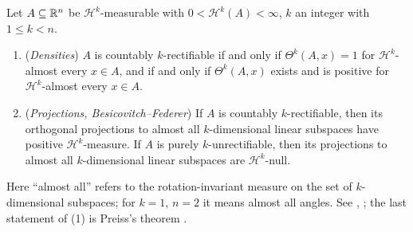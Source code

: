\begin{theorem}\label{measure-theory:theorem-rectifiability-criteria}
Let $A \subseteq \mathbb{R}^n$ be $\mathcal{H}^k$-measurable with $0 < \mathcal{H}^k(A) < \infty$, $k$ an integer with $1 \leq k < n$.
\begin{enumerate}
\item (\emph{Densities}) $A$ is countably $k$-rectifiable if and only if $\Theta^k(A, x) = 1$ for $\mathcal{H}^k$-almost every $x \in A$, and if and only if $\Theta^k(A, x)$ exists and is positive for
$\mathcal{H}^k$-almost every $x \in A$.
\item (\emph{Projections, Besicovitch--Federer}) If $A$ is countably $k$-rectifiable, then its orthogonal projections to almost all $k$-dimensional linear subspaces have positive $\mathcal{H}^k$-measure. If
$A$ is purely $k$-unrectifiable, then its projections to almost all $k$-dimensional linear subspaces are $\mathcal{H}^k$-null.
\end{enumerate}
Here ``almost all'' refers to the rotation-invariant measure on the set of $k$-dimensional subspaces; for $k = 1$, $n = 2$ it means almost all angles. See \cite{mattila-1995}, \cite{federer-gmt}; the last
statement of (1) is Preiss's theorem \cite{preiss-1987}.
\end{theorem}

